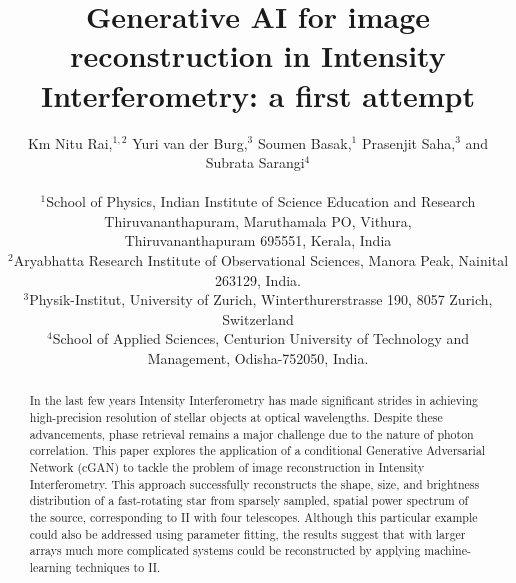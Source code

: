 \documentclass[fleqn,usenatbib,twocolumn]{mnras}
\title{Generative AI for image reconstruction in Intensity Interferometry: a first attempt}
\date{}
\author[Rai et al.]{Km Nitu Rai,$^{1,2}$ Yuri van der Burg,$^{3}$ Soumen Basak,$^{1}$ Prasenjit Saha,$^{3}$ and
	Subrata Sarangi$^{4}$ \\ \\
	$^{1}$School of Physics, Indian Institute of Science Education and Research Thiruvananthapuram, Maruthamala PO,
	Vithura,\\ Thiruvananthapuram 695551, Kerala, India \\
	$^{2}$Aryabhatta Research Institute of Observational Sciences, Manora Peak, Nainital 263129, India. \\
	$^{3}$Physik-Institut, University of Zurich, Winterthurerstrasse 190, 8057 Zurich, Switzerland \\
	$^{4}$School of Applied Sciences, Centurion University of Technology and Management, Odisha-752050, India.}
\begin{document}
\maketitle

\begin{abstract}
In the last few years Intensity Interferometry has made significant strides in achieving high-precision resolution of stellar objects at optical wavelengths. Despite these advancements, phase retrieval remains a major challenge due to the nature of photon correlation. This paper explores the application of a conditional Generative Adversarial Network (cGAN) to tackle the problem of image reconstruction in Intensity Interferometry. This approach successfully reconstructs the shape, size, and brightness distribution of a fast-rotating star from sparsely sampled, spatial power spectrum of the source, corresponding to II with four telescopes.  Although this particular example could also be addressed using parameter fitting, the results suggest that with larger arrays much more complicated systems could be reconstructed by applying machine-learning techniques to II.
\end{abstract}









\end{document}
